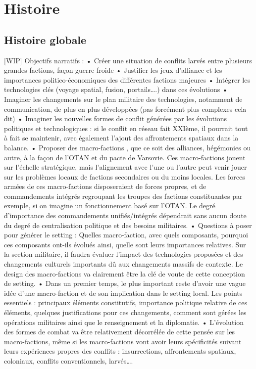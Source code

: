 \documentclass[10pt,a4paper]{book}
\begin{document}
\chapter{Histoire}
\begin{multicols}{2}
\section{Histoire globale}
[WIP]
Objectifs narratifs : 
	• Créer une situation de conflits larvés entre plusieurs grandes factions, façon guerre froide
	• Justifier les jeux d'alliance et les importances politico-économiques des différentes factions majeures
	• Intégrer les technologies clés (voyage spatial, fusion, portails….) dans ces évolutions
	• Imaginer les changements sur le plan militaire des technologies, notamment de communication, de plus en plus développées (pas forcément plus complexes cela dit)
	• Imaginer les nouvelles formes de conflit générées par les évolutions politiques et technologiques : si le conflit en réseau fait XXIème, il pourrait tout à fait se maintenir, avec également l'ajout des affrontements spatiaux dans la balance.
	• Proposer des macro-factions , que ce soit des alliances, hégémonies ou autre, à la façon de l'OTAN et du pacte de Varsovie. Ces macro-factions jouent sur l'échelle stratégique, mais l'alignement avec l'une ou l'autre peut venir jouer sur les problèmes locaux de factions secondaires ou du moins locales. Les forces armées de ces macro-factions disposeraient de forces propres, et de commandements intégrés regroupant les troupes des factions constituantes par exemple, si on imagine un fonctionnement basé sur l'OTAN. Le degré d'importance des commandements unifiés/intégrés dépendrait sans aucun doute du degré de centralisation politique et des besoins militaires.
	• Questions à poser pour générer le setting : Quelles macro-faction, avec quels composants, pourquoi ces composants ont-ils évolués ainsi, quelle sont leurs importances relatives. Sur la section militaire, il faudra évaluer l'impact des technologies proposées et des changements culturels importants dû aux changements massifs de contexte. Le design des macro-factions va clairement être la clé de voute de cette conception de setting. 
	• Dans un premier temps, le plus important reste d'avoir une vague idée d'une macro-faction et de son implication dans le setting local. Les points essentiels : principaux éléments constitutifs, importance politique relative de ces éléments, quelques justifications pour ces changements, comment sont gérées les opérations militaires ainsi que le renseignement et la diplomatie. 
	• L'évolution des formes de combat va être relativement décorrélée de cette pensée sur les macro-factions, même si les macro-factions vont avoir leurs spécificités suivant leurs expériences propres des conflits : insurrections, affrontements spatiaux, coloniaux, conflits conventionnels, larvés….


\end{multicols}
\end{document}
